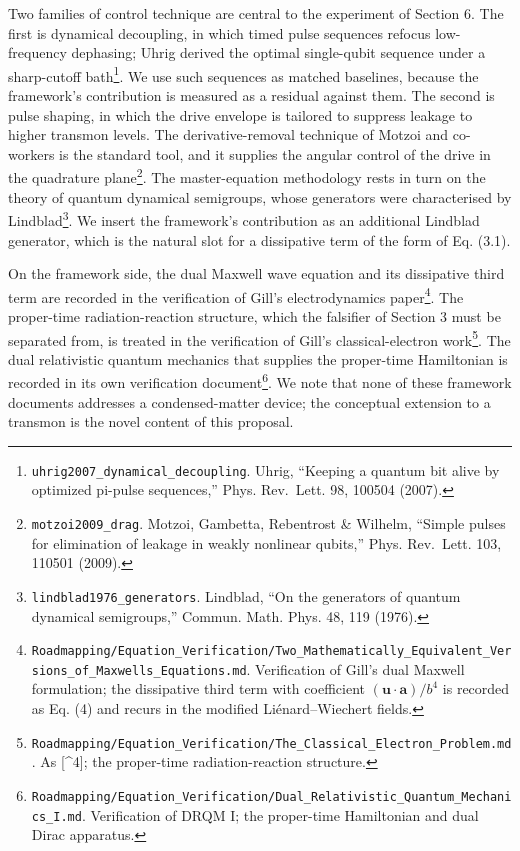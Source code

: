 \documentclass[
  11pt,
]{article}
\begin{document}
Two families of control technique are central to the experiment of
Section 6. The first is dynamical decoupling, in which timed pulse
sequences refocus low-frequency dephasing; Uhrig derived the optimal
single-qubit sequence under a sharp-cutoff bath\footnote{\texttt{uhrig2007\_dynamical\_decoupling}.
  Uhrig, ``Keeping a quantum bit alive by optimized pi-pulse
  sequences,'' Phys. Rev.~Lett. 98, 100504 (2007).}. We use such
sequences as matched baselines, because the framework's contribution is
measured as a residual against them. The second is pulse shaping, in
which the drive envelope is tailored to suppress leakage to higher
transmon levels. The derivative-removal technique of Motzoi and
co-workers is the standard tool, and it supplies the angular control of
the drive in the quadrature plane\footnote{\texttt{motzoi2009\_drag}.
  Motzoi, Gambetta, Rebentrost \& Wilhelm, ``Simple pulses for
  elimination of leakage in weakly nonlinear qubits,'' Phys. Rev.~Lett.
  103, 110501 (2009).}. The master-equation methodology rests in turn on
the theory of quantum dynamical semigroups, whose generators were
characterised by Lindblad\footnote{\texttt{lindblad1976\_generators}.
  Lindblad, ``On the generators of quantum dynamical semigroups,''
  Commun. Math. Phys. 48, 119 (1976).}. We insert the framework's
contribution as an additional Lindblad generator, which is the natural
slot for a dissipative term of the form of Eq. (3.1).

On the framework side, the dual Maxwell wave equation and its
dissipative third term are recorded in the verification of Gill's
electrodynamics paper\footnote{\texttt{Roadmapping/Equation\_Verification/Two\_Mathematically\_Equivalent\_Versions\_of\_Maxwells\_Equations.md}.
  Verification of Gill's dual Maxwell formulation; the dissipative third
  term with coefficient \((\mathbf{u}\!\cdot\!\mathbf{a})/b^4\) is
  recorded as Eq. (4) and recurs in the modified Liénard--Wiechert
  fields.}. The proper-time radiation-reaction structure, which the
falsifier of Section 3 must be separated from, is treated in the
verification of Gill's classical-electron work\footnote{\texttt{Roadmapping/Equation\_Verification/The\_Classical\_Electron\_Problem.md}.
  As {[}\^{}4{]}; the proper-time radiation-reaction structure.}. The
dual relativistic quantum mechanics that supplies the proper-time
Hamiltonian is recorded in its own verification document\footnote{\texttt{Roadmapping/Equation\_Verification/Dual\_Relativistic\_Quantum\_Mechanics\_I.md}.
  Verification of DRQM I; the proper-time Hamiltonian and dual Dirac
  apparatus.}. We note that none of these framework documents addresses
a condensed-matter device; the conceptual extension to a transmon is the
novel content of this proposal.
\end{document}
